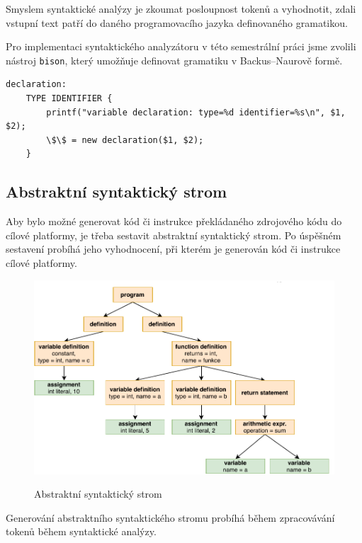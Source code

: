 \documentclass[12pt, a4paper]{article}
\begin{document}
Smyslem syntaktické analýzy je zkoumat posloupnost tokenů a vyhodnotit, zdali vstupní text patří do daného programovacího jazyka definovaného gramatikou.

Pro implementaci syntaktického analyzátoru v této semestrální práci jsme zvolili nástroj \texttt{bison}, který umožňuje definovat gramatiku v Backus–Naurově formě.

\begin{lstlisting}[caption={Ukázka pravidla v \texttt{bison} syntaxi pro deklaraci proměnné}, captionpos=b, style=flex]
declaration:
    TYPE IDENTIFIER {
        printf("variable declaration: type=%d identifier=%s\n", $1, $2);
        \$\$ = new declaration($1, $2);
    }
\end{lstlisting}


\subsection{Abstraktní syntaktický strom}

Aby bylo možné generovat kód či instrukce překládaného zdrojového kódu do cílové platformy, je třeba sestavit abstraktní syntaktický strom. Po úspěšném sestavení probíhá jeho vyhodnocení, při kterém je generován kód či instrukce cílové platformy.

\begin{figure}[!ht]
    \centering
    {\includegraphics[width=\textwidth]{pdf/syntanalysis.pdf}}
    \caption{Abstraktní syntaktický strom}
    \label{fig:screen-transition-diagram}
\end{figure}

Generování abstraktního syntaktického stromu probíhá během zpracovávání tokenů během syntaktické analýzy. 
\end{document}

